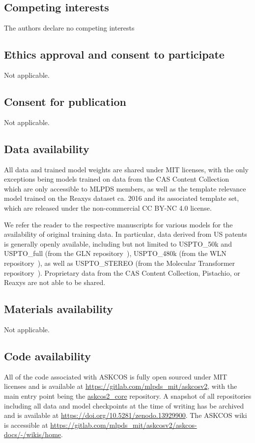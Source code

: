 \documentclass[pdflatex,sn-mathphys-num]{sn-jnl}%
\theoremstyle{thmstyleone}%
\theoremstyle{thmstyletwo}%
\theoremstyle{thmstylethree}%
\begin{document}
\subsection{Competing interests}

The authors declare no competing interests

\subsection{Ethics approval and consent to participate}
Not applicable.
\subsection{Consent for publication}
Not applicable.
\subsection{Data availability}

All data and trained model weights are shared under MIT licenses, with the only exceptions being models trained on data from the CAS Content Collection~\citep{CASContent} which are only accessible to MLPDS members, as well as the template relevance model trained on the Reaxys dataset ca. 2016 and its associated template set, which are released under the non-commercial CC BY-NC 4.0 license.

We refer the reader to the respective manuscripts for various models for the availability of original training data. In particular, data derived from US patents is generally openly available, including but not limited to USPTO\_50k and USPTO\_full (from the GLN repository~\citep{GLNRepo}), USPTO\_480k (from the WLN repository~\citep{WLNRepo}), as well as USPTO\_STEREO (from the Molecular Transformer repository~\citep{MTRepo}). Proprietary data from the CAS Content Collection, Pistachio, or Reaxys are not able to be shared.

\subsection{Materials availability}
Not applicable.

\subsection{Code availability}

All of the code associated with ASKCOS is fully open sourced under MIT licenses and is available at \href{https://gitlab.com/mlpds\_mit/askcosv2}{https://gitlab.com/mlpds\_mit/askcosv2}, with the main entry point being the \href{https://gitlab.com/mlpds\_mit/askcosv2/askcos2\_core}{askcos2\_core} repository. A snapshot of all repositories including all data and model checkpoints at the time of writing has be archived and is available at \href{https://doi.org/10.5281/zenodo.13929900}{https://doi.org/10.5281/zenodo.13929900}. The ASKCOS wiki is accessible at \href{https://gitlab.com/mlpds\_mit/askcosv2/askcos-docs/-/wikis/home}{https://gitlab.com/mlpds\_mit/askcosv2/askcos-docs/-/wikis/home}.
\end{document}
